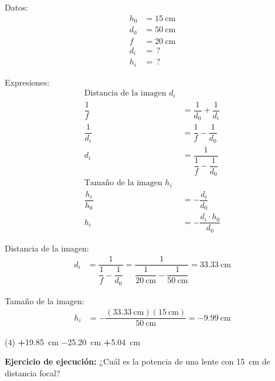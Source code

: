 \documentclass[12pt, letter]{exam}
\begin{document}
\begin{questions}
    \begin{minipage}[t]{0.35\linewidth}
    Datos: 
    \begin{align*}
    h_{0} &= \SI{15}{\centi\meter} \\
    d_{0} &= \SI{50}{\centi\meter} \\
    f &= \SI{20}{\centi\meter} \\
    d_{i} &= \, ? \\
    h_{i} &= \, ?
    \end{align*}
    \end{minipage}
    \hspace{1cm}
    \begin{minipage}[t]{0.4\linewidth}
    Expresiones:
    \begin{align*}
    \text{Distancia de la imagen } d_{i} \\[0.3em]
    \dfrac{1}{f} &= \dfrac{1}{d_{0}} + \dfrac{1}{d_{i}} \\[0.3em]
    \dfrac{1}{d_{i}} &= \dfrac{1}{f} - \dfrac{1}{d_{0}} \\[0.4em]
    d_{i} &= \dfrac{1}{\dfrac{1}{f} - \dfrac{1}{d_{0}}} \\[0.5em]
    \text{Tamaño de la imagen } h_{i} \\[0.3em]
    \dfrac{h_{i}}{h_{0}} &= - \dfrac{d_{i}}{d_{0}} \\[0.5em]
    h_{i} &= - \dfrac{d_{i} \cdot h_{0}}{d_{0}} 
    \end{align*}
    \end{minipage}

    Distancia de la imagen:
    \begin{align*}
    d_{i} &= \dfrac{1}{\dfrac{1}{f} - \dfrac{1}{d_{0}}} = \dfrac{1}{\dfrac{1}{\SI{20}{\centi\meter}} - \dfrac{1}{\SI{50}{\centi\meter}}} = \SI{33.33}{\centi\meter}
    \end{align*}

    Tamaño de la imagen:
    \begin{align*}
    h_{i} &= - \dfrac{(\SI{33.33}{\centi\meter})(\SI{15}{\centi\meter})}{\SI{50}{\centi\meter}} = -\SI{9.99}{\centi\meter}
    \end{align*}
    
    \begin{tasks}(4)
        \task \textbf{+}\SI{19.85}{\centi\meter}
        \task {}
        \task \SI{-25.20}{\centi\meter}
        \task \textbf{+}\SI{5.04}{\centi\meter}
    \end{tasks}

    \setcounter{question}{19} \question \textbf{Ejercicio de ejecución: } ¿Cuál es la potencia de una lente con \SI{15}{\centi\meter} de distancia focal?


\end{questions}
\end{document}
